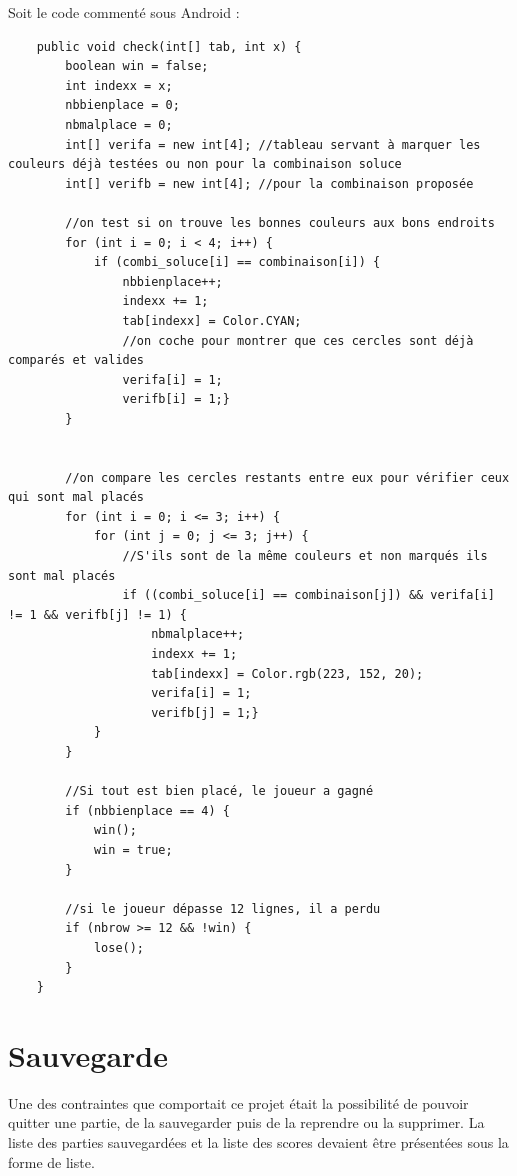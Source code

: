 \documentclass{article}
\begin{document}
Soit le code commenté sous Android :
\begin{verbatim}
    public void check(int[] tab, int x) {
        boolean win = false;
        int indexx = x;
        nbbienplace = 0;
        nbmalplace = 0;
        int[] verifa = new int[4]; //tableau servant à marquer les couleurs déjà testées ou non pour la combinaison soluce
        int[] verifb = new int[4]; //pour la combinaison proposée

        //on test si on trouve les bonnes couleurs aux bons endroits
        for (int i = 0; i < 4; i++) {
            if (combi_soluce[i] == combinaison[i]) {
                nbbienplace++;
                indexx += 1;
                tab[indexx] = Color.CYAN;
                //on coche pour montrer que ces cercles sont déjà comparés et valides
                verifa[i] = 1;
                verifb[i] = 1;}
        }


        //on compare les cercles restants entre eux pour vérifier ceux qui sont mal placés
        for (int i = 0; i <= 3; i++) {
            for (int j = 0; j <= 3; j++) {
                //S'ils sont de la même couleurs et non marqués ils sont mal placés
                if ((combi_soluce[i] == combinaison[j]) && verifa[i] != 1 && verifb[j] != 1) {
                    nbmalplace++;
                    indexx += 1;
                    tab[indexx] = Color.rgb(223, 152, 20);
                    verifa[i] = 1;
                    verifb[j] = 1;}
            }
        }

        //Si tout est bien placé, le joueur a gagné
        if (nbbienplace == 4) {
            win();
            win = true;
        }

        //si le joueur dépasse 12 lignes, il a perdu
        if (nbrow >= 12 && !win) {
            lose();
        }
    }
\end{verbatim}

\section{Sauvegarde}
Une des contraintes que comportait ce projet \'{e}tait la possibilit\'{e} de pouvoir quitter une partie, de la sauvegarder puis de la reprendre ou la supprimer. La liste des parties sauvegard\'{e}es et la liste des scores devaient \^{e}tre pr\'{e}sent\'{e}es sous la forme de liste.
\end{document}
